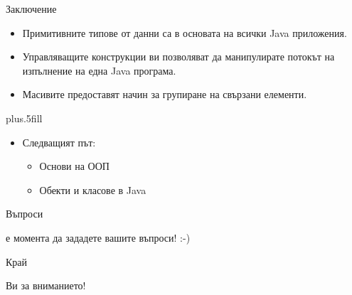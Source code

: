 \documentclass{beamer}
\begin{document}
\begin{frame}{Заключение}
  \transdissolve
  \begin{itemize}
  \item
    Примитивните типове от данни са в основата на \alert{всички} Java приложения.
  \item
    Управляващите конструкции ви позволяват да манипулирате потокът на
    изпълнение на една Java програма.
  \item
    Масивите предоставят начин за групиране на свързани елементи.
  \end{itemize}
  
  \vskip0pt plus.5fill
  \begin{itemize}
  \item
    Следващият път:
    \begin{itemize}
    \item
      Основи на ООП
    \item
      Обекти и класове в Java
    \end{itemize}
  \end{itemize}
\end{frame}


\begin{frame}{Въпроси}
  \transdissolve
  \begin{center}
     е момента да зададете вашите въпроси! :-)
  \end{center}
\end{frame}


\begin{frame}{Край}
  \transdissolve
  \begin{center}
     Ви за вниманието!
  \end{center}
  
\end{frame}
\end{document}
